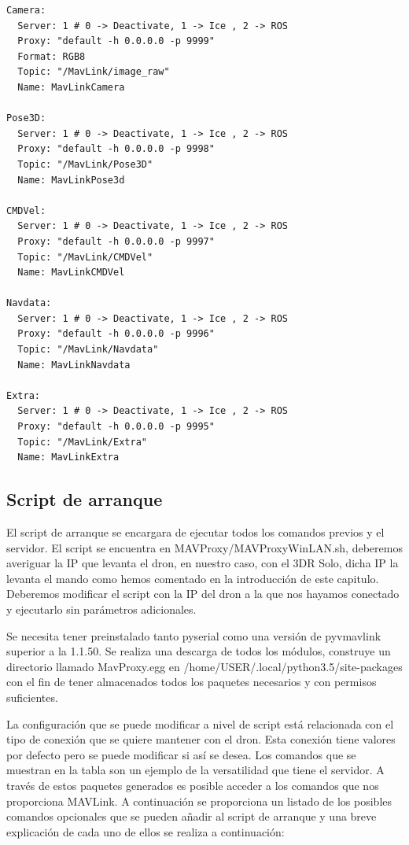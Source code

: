 \begin{lstlisting}[frame=single]
Camera:
  Server: 1 # 0 -> Deactivate, 1 -> Ice , 2 -> ROS
  Proxy: "default -h 0.0.0.0 -p 9999"
  Format: RGB8
  Topic: "/MavLink/image_raw"
  Name: MavLinkCamera

Pose3D:
  Server: 1 # 0 -> Deactivate, 1 -> Ice , 2 -> ROS
  Proxy: "default -h 0.0.0.0 -p 9998"
  Topic: "/MavLink/Pose3D"
  Name: MavLinkPose3d

CMDVel:
  Server: 1 # 0 -> Deactivate, 1 -> Ice , 2 -> ROS
  Proxy: "default -h 0.0.0.0 -p 9997"
  Topic: "/MavLink/CMDVel"
  Name: MavLinkCMDVel

Navdata:
  Server: 1 # 0 -> Deactivate, 1 -> Ice , 2 -> ROS
  Proxy: "default -h 0.0.0.0 -p 9996"
  Topic: "/MavLink/Navdata"
  Name: MavLinkNavdata

Extra:
  Server: 1 # 0 -> Deactivate, 1 -> Ice , 2 -> ROS
  Proxy: "default -h 0.0.0.0 -p 9995"
  Topic: "/MavLink/Extra"
  Name: MavLinkExtra
\end{lstlisting}



\subsection{Script de arranque}
\label{Script de arranque}

El script de arranque se encargara de ejecutar todos los comandos previos y el servidor. El script se encuentra en MAVProxy/MAVProxyWinLAN.sh, deberemos averiguar la IP que levanta el dron, en nuestro caso, con el 3DR Solo, dicha IP la levanta el mando como hemos comentado en la introducción de este capitulo. Deberemos modificar el script con la IP del dron a la que nos hayamos conectado y ejecutarlo sin parámetros adicionales. 

Se necesita tener preinstalado tanto pyserial como una versión de pyvmavlink superior a la 1.1.50. Se realiza una descarga de todos los módulos, construye un directorio llamado MavProxy.egg en /home/USER/.local/python3.5/site-packages con el fin de tener almacenados todos los paquetes necesarios y con permisos suficientes. 

La configuración que se puede modificar a nivel de script está relacionada con el tipo de conexión que se quiere mantener con el dron. Esta conexión tiene valores por defecto pero se puede modificar si así se desea. Los comandos que se muestran en la tabla son un ejemplo de la versatilidad que tiene el servidor. A través de estos paquetes generados es posible acceder a los comandos que nos proporciona MAVLink. A continuación se proporciona un listado de los posibles comandos opcionales que se pueden añadir al script de arranque y una breve explicación de cada uno de ellos se realiza a continuación:

